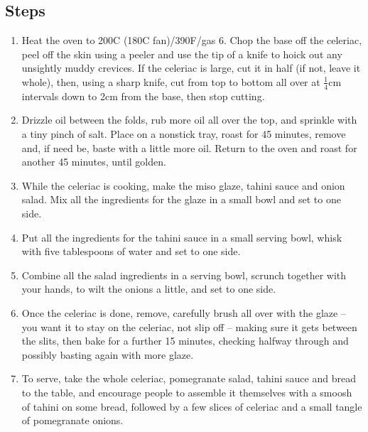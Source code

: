 \documentclass{book}
\begin{document}
\subsection*{Steps}
\begin{enumerate}
\item Heat the oven to 200C (180C fan)/390F/gas 6. Chop the base off the celeriac, peel off the skin using a peeler and use the tip of a knife to hoick out any unsightly muddy crevices. If the celeriac is large, cut it in half (if not, leave it whole), then, using a sharp knife, cut from top to bottom all over at $\frac{1}{4}$cm intervals down to 2cm from the base, then stop cutting.
\item Drizzle oil between the folds, rub more oil all over the top, and sprinkle with a tiny pinch of salt. Place on a nonstick tray, roast for 45 minutes, remove and, if need be, baste with a little more oil. Return to the oven and roast for another 45 minutes, until golden.
\item While the celeriac is cooking, make the miso glaze, tahini sauce and onion salad. Mix all the ingredients for the glaze in a small bowl and set to one side.
\item Put all the ingredients for the tahini sauce in a small serving bowl, whisk with five tablespoons of water and set to one side.
\item Combine all the salad ingredients in a serving bowl, scrunch together with your hands, to wilt the onions a little, and set to one side.
\item Once the celeriac is done, remove, carefully brush all over with the glaze – you want it to stay on the celeriac, not slip off – making sure it gets between the slits, then bake for a further 15 minutes, checking halfway through and possibly basting again with more glaze.
\item To serve, take the whole celeriac, pomegranate salad, tahini sauce and bread to the table, and encourage people to assemble it themselves with a smoosh of tahini on some bread, followed by a few slices of celeriac and a small tangle of pomegranate onions.
\end{enumerate}
\newpage
\end{document}
